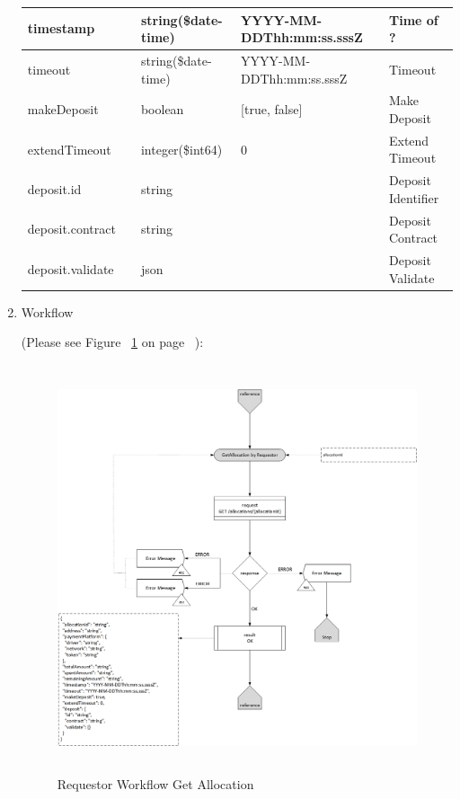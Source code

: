 \begin{enumerate}
\begin{table}[H]
\begin{center}
\begin{tabular}{|p{3cm}|l|p{3cm}|p{3cm}|p{4cm}|}
timestamp					&   &	string(\$date-time)	&	YYYY-MM-DDThh:mm:ss.sssZ	&	Time of ? \\
\hline

timeout						& 	& 	string(\$date-time)	&	YYYY-MM-DDThh:mm:ss.sssZ	&	Timeout \\ 
\hline

makeDeposit					& 	& 	boolean				&	[true, false]				&	Make Deposit \\ 
\hline

extendTimeout				& 	& 	integer(\$int64)	&	0							&	Extend Timeout \\ 
\hline

deposit.id					&   & 	string				&								&	Deposit Identifier \\
\hline

deposit.contract			&   &	string				&								&	Deposit Contract \\
\hline

deposit.validate			&   &	json				&								&	Deposit Validate \\
\hline

\end{tabular}
\end{center}
\end{table}

\item Workflow

(Please see Figure ~\ref{fig:RGA} on page ~\pageref{fig:RGA}):

\begin{figure}[htbp]
    \centering
    \includegraphics[width=12cm,height=12cm,angle=0]{./diag/Workflow/Payment/GetAllocation-R-Workflow.png}
    \caption{Requestor Workflow Get Allocation }
	\label{fig:RGA}
\end{figure}


\end{enumerate}

